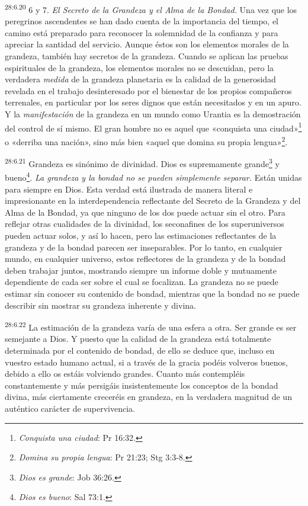 \par
\textsuperscript{28:6.20} 6 y 7. \textit{El Secreto de la Grandeza y el Alma de la Bondad.} Una vez que los peregrinos ascendentes se han dado cuenta de la importancia del tiempo, el camino está preparado para reconocer la solemnidad de la confianza y para apreciar la santidad del servicio. Aunque éstos son los elementos morales de la grandeza, también hay secretos de la grandeza. Cuando se aplican las pruebas espirituales de la grandeza, los elementos morales no se descuidan, pero la verdadera \textit{medida} de la grandeza planetaria es la calidad de la generosidad revelada en el trabajo desinteresado por el bienestar de los propios compañeros terrenales, en particular por los seres dignos que están necesitados y en un apuro. Y la \textit{manifestación} de la grandeza en un mundo como Urantia es la demostración del control de sí mismo. El gran hombre no es aquel que «conquista una ciudad»\footnote{\textit{Conquista una ciudad}: Pr 16:32.} o «derriba una nación», sino más bien «aquel que domina su propia lengua»\footnote{\textit{Domina su propia lengua}: Pr 21:23; Stg 3:3-8.}.

\par
\textsuperscript{28:6.21} Grandeza es sinónimo de divinidad. Dios es supremamente grande\footnote{\textit{Dios es grande}: Job 36:26.} y bueno\footnote{\textit{Dios es bueno}: Sal 73:1.}. \textit{La grandeza y la bondad no se pueden simplemente separar.} Están unidas para siempre en Dios. Esta verdad está ilustrada de manera literal e impresionante en la interdependencia reflectante del Secreto de la Grandeza y del Alma de la Bondad, ya que ninguno de los dos puede actuar sin el otro. Para reflejar otras cualidades de la divinidad, los seconafines de los superuniversos pueden actuar solos, y así lo hacen, pero las estimaciones reflectantes de la grandeza y de la bondad parecen ser inseparables. Por lo tanto, en cualquier mundo, en cualquier universo, estos reflectores de la grandeza y de la bondad deben trabajar juntos, mostrando siempre un informe doble y mutuamente dependiente de cada ser sobre el cual se focalizan. La grandeza no se puede estimar sin conocer su contenido de bondad, mientras que la bondad no se puede describir sin mostrar su grandeza inherente y divina.

\par
\textsuperscript{28:6.22} La estimación de la grandeza varía de una esfera a otra. Ser grande es ser semejante a Dios. Y puesto que la calidad de la grandeza está totalmente determinada por el contenido de bondad, de ello se deduce que, incluso en vuestro estado humano actual, si a través de la gracia podéis volveros buenos, debido a ello os estáis volviendo grandes. Cuanto más contempléis constantemente y más persigáis insistentemente los conceptos de la bondad divina, más ciertamente creceréis en grandeza, en la verdadera magnitud de un auténtico carácter de supervivencia.

